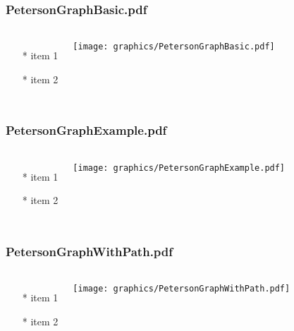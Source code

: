 \begin{frame} \frametitle{PetersonGraphBasic.pdf}
    \begin{columns}[c]
        \begin{itemize}
            \item[*] item 1
            \item[*] item 2
        \end{itemize}
        \begin{minipage}{\linewidth}
            \begin{center}
            \texttt{[image: graphics/PetersonGraphBasic.pdf]}
            \label{gfx:PetersonGraphBasic.pdf}
            \end{center}
        \end{minipage}
    \end{columns}
\end{frame}
\begin{frame} \frametitle{PetersonGraphExample.pdf}
    \begin{columns}[c]
        \begin{itemize}
            \item[*] item 1
            \item[*] item 2
        \end{itemize}
        \begin{minipage}{\linewidth}
            \begin{center}
            \texttt{[image: graphics/PetersonGraphExample.pdf]}
            \label{gfx:PetersonGraphExample.pdf}
            \end{center}
        \end{minipage}
    \end{columns}
\end{frame}
\begin{frame} \frametitle{PetersonGraphWithPath.pdf}
    \begin{columns}[c]
        \begin{itemize}
            \item[*] item 1
            \item[*] item 2
        \end{itemize}
        \begin{minipage}{\linewidth}
            \begin{center}
            \texttt{[image: graphics/PetersonGraphWithPath.pdf]}
            \label{gfx:PetersonGraphWithPath.pdf}
            \end{center}
        \end{minipage}
    \end{columns}
\end{frame}

